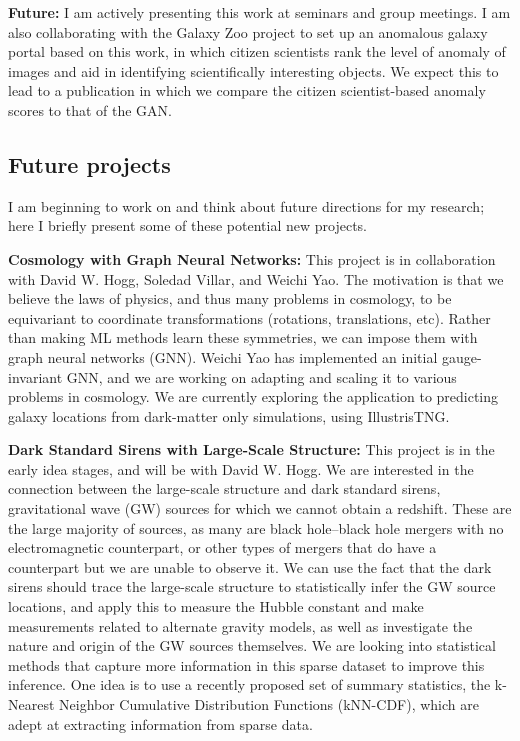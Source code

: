 \documentclass{article}
\begin{document}
\textbf{Future:}
I am actively presenting this work at seminars and group meetings.
I am also collaborating with the Galaxy Zoo project to set up an anomalous galaxy portal based on this work, in which citizen scientists rank the level of anomaly of images and aid in identifying scientifically interesting objects.
We expect this to lead to a publication in which we compare the citizen scientist-based anomaly scores to that of the GAN.


\subsection{Future projects}

I am beginning to work on and think about future directions for my research; here I briefly present some of these potential new projects.

\textbf{Cosmology with Graph Neural Networks:} This project is in collaboration with David W. Hogg, Soledad Villar, and Weichi Yao.
The motivation is that we believe the laws of physics, and thus many problems in cosmology, to be equivariant to coordinate transformations (rotations, translations, etc). 
Rather than making ML methods learn these symmetries, we can impose them with graph neural networks (GNN).
Weichi Yao has implemented an initial gauge-invariant GNN, and we are working on adapting and scaling it to various problems in cosmology. 
We are currently exploring the application to predicting galaxy locations from dark-matter only simulations, using IllustrisTNG.

\textbf{Dark Standard Sirens with Large-Scale Structure:} This project is in the early idea stages, and will be with David W. Hogg.
We are interested in the connection between the large-scale structure and dark standard sirens, gravitational wave (GW) sources for which we cannot obtain a redshift.
These are the large majority of sources, as many are black hole--black hole mergers with no electromagnetic counterpart, or other types of mergers that do have a counterpart but we are unable to observe it.
We can use the fact that the dark sirens should trace the large-scale structure to statistically infer the GW source locations, and apply this to measure the Hubble constant and make measurements related to alternate gravity models, as well as investigate the nature and origin of the GW sources themselves.
We are looking into statistical methods that capture more information in this sparse dataset to improve this inference. 
One idea is to use a recently proposed set of summary statistics, the k-Nearest Neighbor Cumulative Distribution Functions (kNN-CDF), which are adept at extracting information from sparse data.
\end{document}
